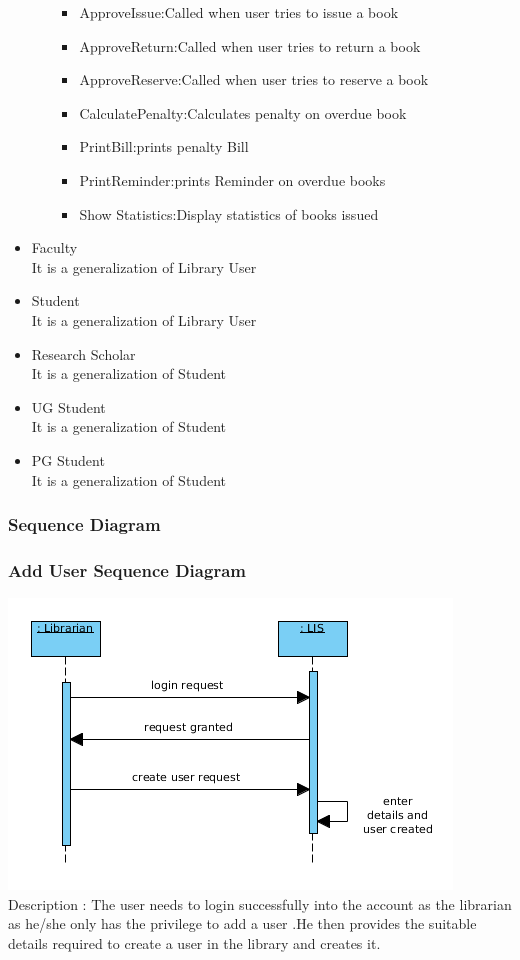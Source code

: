 \documentclass[a4paper]{article}
\begin{document}
\begin{itemize}
\begin{itemize}
\begin{itemize}
\item ApproveIssue:Called when user tries to issue a book
\item ApproveReturn:Called when user tries to return a book

\item ApproveReserve:Called when user tries to reserve a book
\item CalculatePenalty:Calculates penalty on overdue book
\item PrintBill:prints penalty Bill
\item PrintReminder:prints Reminder on overdue books
\item Show Statistics:Display statistics of books issued

\end{itemize}
\end{itemize}

\item Faculty\\
It is a generalization of Library User
\item Student\\
It is a generalization of Library User
\item Research Scholar\\
It is a generalization of Student
\item UG Student\\
It is a generalization of Student
\item PG Student\\
It is a generalization of Student

\end{itemize}
\subsubsection{Sequence Diagram}
\subsubsection*{Add User Sequence Diagram}
\includegraphics[scale=0.50]{images/seqDiagAddUser.png}
\\
Description : The user needs to login successfully into the account as the librarian as he/she only has the privilege to add a user .He then provides the suitable details required to create a user in the library and creates it.
\\
\end{document}
